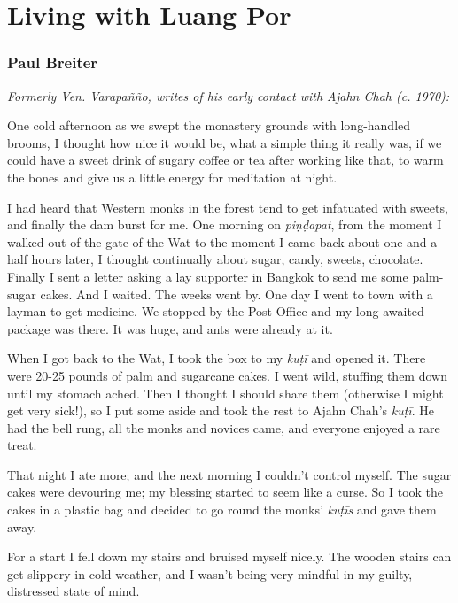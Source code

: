 
\chapter{Living with Luang Por}

\subsection{Paul Breiter}

\emph{Formerly Ven. Varapañño, writes of his early contact with Ajahn Chah (c. 1970):}

One cold afternoon as we swept the monastery grounds with long-handled
brooms, I thought how nice it would be, what a simple thing it really
was, if we could have a sweet drink of sugary coffee or tea after
working like that, to warm the bones and give us a little energy for
meditation at night. 

I had heard that Western monks in the forest tend to get infatuated with
sweets, and finally the dam burst for me. One morning on
\emph{piṇḍapat}, from the moment I walked out of the gate of the Wat to
the moment I came back about one and a half hours later, I thought
continually about sugar, candy, sweets, chocolate. Finally I sent a
letter asking a lay supporter in Bangkok to send me some palm-sugar
cakes. And I waited. The weeks went by. One day I went to town with a
layman to get medicine. We stopped by the Post Office and my
long-awaited package was there. It was huge, and ants were already at
it. 

When I got back to the Wat, I took the box to my \emph{kuṭī} and opened
it. There were 20-25 pounds of palm and sugarcane cakes. I went wild,
stuffing them down until my stomach ached. Then I thought I should share
them (otherwise I might get very sick!), so I put some aside and took
the rest to Ajahn Chah's \emph{kuṭī}. He had the bell rung, all the
monks and novices came, and everyone enjoyed a rare treat. 

That night I ate more; and the next morning I couldn't control myself. 
The sugar cakes were devouring me; my blessing started to seem like a
curse. So I took the cakes in a plastic bag and decided to go round the
monks' \emph{kuṭīs} and gave them away. 

For a start I fell down my stairs and bruised myself nicely. The wooden
stairs can get slippery in cold weather, and I wasn't being very mindful
in my guilty, distressed state of mind. 

